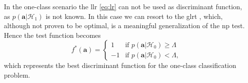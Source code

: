\documentclass[draftcls,onecolumn,12pt]{IEEEtran}
\begin{document}
In the one-class scenario the \ac{llr} \eqref{eq:lr} can not be used as discriminant function, as $p(\bm{a}|\mathcal{H}_1)$ is not known. In this case we can resort to the \ac{glrt} \cite{Kay-book}, which, although not proven to be optimal, is a meaningful generalization of the \ac{np} test. Hence the test function becomes 
%
%
%
\begin{equation}
\label{eq:oneClassDec}
f^*(\bm{a}) =
\begin{cases}
1 &\text{if } p(\bm{a}|\mathcal{H}_0) \geq \Lambda \\
-1 & \text{if } p(\bm{a}|\mathcal{H}_0) < \Lambda,
\end{cases}
\end{equation}
which represents the best discriminant function for the one-class classification problem.
\end{document}
